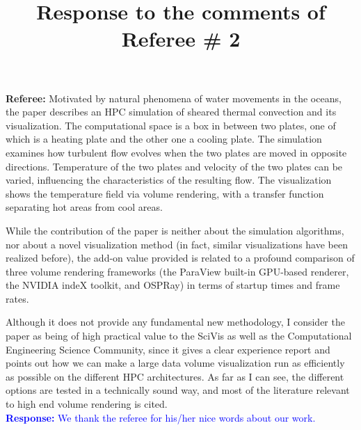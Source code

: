 \documentclass[]{article}
\title{Response to the comments of Referee \# 2}
\begin{document}
\maketitle

\textbf{Referee:} Motivated by natural phenomena of water movements in the oceans, the paper describes an HPC simulation of sheared thermal convection and its visualization. The computational space is a box in between two plates, one of which is a heating plate and the other one a cooling plate. The simulation examines how turbulent flow evolves when the two plates are moved in opposite directions. Temperature of the two plates and velocity of the two plates can be varied, influencing the characteristics of the resulting flow.  The visualization shows the temperature field via volume rendering, with a transfer function separating hot areas from cool areas.

While the contribution of the paper is neither about the simulation algorithms, nor about a novel visualization method (in fact, similar visualizations have been realized before), the add-on value provided is related to a profound comparison of three volume rendering frameworks (the ParaView built-in GPU-based renderer, the NVIDIA indeX toolkit, and OSPRay) in terms of startup times and frame rates.

Although it does not provide any fundamental new methodology, I consider the paper as being of high practical value to the SciVis as well as the Computational Engineering Science Community, since it gives a clear experience report and points out how we can make a large data volume visualization run as efficiently as possible on the different HPC architectures. As far as I can see, the different options are tested in a technically sound way, and most of the literature relevant to high end volume rendering is cited.\\

\textcolor{blue}{\textbf{Response:} We thank the referee for his/her nice words about our work. }
\end{document}
